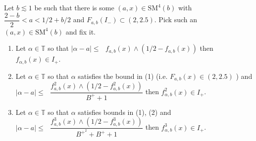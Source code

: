 \documentclass[10pt,a4paper]{amsart}
\begin{document}
\begin{lemma}\label{setting up1}
    Let $b\lesssim1$ be such that there is some $(a,x)\in \text{SM}^4(b)$ with $\dfrac{2-b}{2}<a <1/2+b/2$ and $F_{a,b}(I_-)\subset (2,2.5)$.
    Pick such an $(a,x)\in \text{SM}^{4}(b)$ and fix it. 
    \begin{enumerate}
        \item Let $\alpha \in \mathbb{T}$ so that $|\alpha-a| \leq \text{ } f_{a,b}(x) \wedge (1/2-f_{a,b}(x))$ then $f_{\alpha,b}(x)\in I_+$.
        \vspace{.3cm}
        
        \item Let $\alpha \in \mathbb{T}$ so that $\alpha$ satisfies the bound in (1) (i.e. $F_{a,b}(x) \in (2,2.5) $ ) 
        and $|\alpha-a| \leq \text{ } \dfrac{f^2_{a,b}(x) \wedge (1/2-f^2_{a,b}(x))}{B^++1} $ then $f^2_{\alpha,b}(x)\in I_+$.
          \vspace{.3cm}
        \item Let $\alpha \in \mathbb{T}$ so that $\alpha$ satisfies bounds in  (1), (2) and  $|\alpha-a| \leq \text{ } \dfrac{f^3_{a,b}(x) \wedge (1/2-f^3_{a,b}(x))}{B^{+^{2}}+B^++1} $ then $f^3_{\alpha,b}(x)\in I_+$.
        
    \end{enumerate}
\end{lemma}
\end{document}
